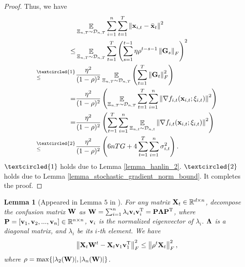 \documentclass{article}
\newtheorem{Lemma}{\bf{Lemma}}
\begin{document}
\begin{proof}
Thus, we  have
\begin{align}
\nonumber
& \EE_{ \Xi_{n,T} \sim \Dcal_{n,T} } \sum_{i=1}^n\sum_{t=1}^T \lrnorm{\x_{i,t} - \bar{\x}_t}^2  \\ \nonumber 
\le & \EE_{ \Xi_{n,T} \sim \Dcal_{n,T} } \sum_{t=1}^T \lrincir{ \sum_{s=1}^{t-1} \eta \rho^{t-s-1} \lrnorm{\G_s}_F}^2  \\ \nonumber
\refabovecir{\le}{\textcircled{1}} & \frac{\eta^2}{(1-\rho)^2} \EE_{ \Xi_{n,T} \sim \Dcal_{n,T} } \lrincir{  \sum_{t=1}^T \lrnorm{\G_t}_F^2 } \\ \nonumber
= & \frac{\eta^2}{(1-\rho)^2} \lrincir{ \EE_{ \Xi_{n,T} \sim \Dcal_{n,T} } \sum_{t=1}^T \sum_{i=1}^n  \lrnorm{\nabla f_{i,t}(\x_{i,t}; \xi_{i,t})}^2 } \\ \nonumber
= & \frac{\eta^2}{(1-\rho)^2} \lrincir{  \sum_{t=1}^T \sum_{i=1}^n \EE_{ \Xi_{n,t} \sim \Dcal_{n,t} } \lrnorm{\nabla f_{i,t}(\x_{i,t}; \xi_{i,t})}^2 } \\ \nonumber
\refabovecir{\le}{\textcircled{2}} & \frac{\eta^2}{(1-\rho)^2} \lrincir{  6nTG + 4\sum_{t=1}^T\sum_{i=1}^n \sigma_{i,t}^2 }.
\end{align} $\textcircled{1}$ holds due to Lemma \ref{lemma_hanlin_2}. $\textcircled{2}$ holds due to Lemma \ref{lemma_stochastic_gradient_norm_bound}.
It completes the proof.


\end{proof}








\begin{Lemma}[Appeared in Lemma $5$ in \citep{Tang:2018un}]
\label{lemma_hanlin_1}
For any matrix ${\bf X}_t\in\mathbb{R}^{d\times n}$, decompose the confusion matrix ${\bf W}$ as ${\bf W} = \sum_{i=1}^n \lambda_i {\bf v}_i {\bf v}_i^{\rm T} = {\bf P} \mathbf{\Lambda} {\bf P}^{\rm T}$, where ${\bf P} = [{\bf v}_1, {\bf v}_2, ..., {\bf v}_n]\in\mathbb{R}^{n\times n}$, ${\bf v}_i$ is the normalized eigenvector of $\lambda_i$. $\mathbf{\Lambda}$ is a diagonal matrix, and $\lambda_i$ be its $i$-th element. We have
\begin{align}
\nonumber
\left\lVert{\bf X}_t {\bf W}^t - {\bf X}_t {\bf v}_1 {\bf v}_1^{\rm T} \right\rVert_F^2 \le \left\lVert\rho^t {\bf X}_t\right\rVert_F^2, 
\end{align} where  $\rho = \max \{| \lambda_2({\bf W}) |, | \lambda_n({\bf W}) |\}$. 

\end{Lemma}
\end{document}
